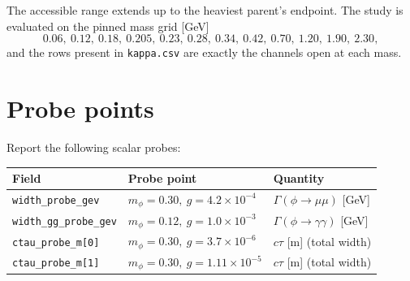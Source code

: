 \documentclass[11pt]{article}
\begin{document}
\noindent
The accessible range extends up to the heaviest parent's endpoint. The study is
evaluated on the pinned mass grid [GeV]
\[
0.06,\ 0.12,\ 0.18,\ 0.205,\ 0.23,\ 0.28,\ 0.34,\ 0.42,\ 0.70,\ 1.20,\ 1.90,\ 2.30,
\]
and the rows present in \texttt{kappa.csv} are exactly the channels open at each
mass.

\section*{Probe points}

Report the following scalar probes:

\begin{center}
\begin{tabular}{@{}lll@{}}
\toprule
Field & Probe point & Quantity \\
\midrule
\texttt{width\_probe\_gev} & $m_\phi=0.30,\ g=4.2\times10^{-4}$ & $\Gamma(\phi\to\mu\mu)$ [GeV] \\
\texttt{width\_gg\_probe\_gev} & $m_\phi=0.12,\ g=1.0\times10^{-3}$ & $\Gamma(\phi\to\gamma\gamma)$ [GeV] \\
\texttt{ctau\_probe\_m[0]} & $m_\phi=0.30,\ g=3.7\times10^{-6}$ & $c\tau$ [m] (total width) \\
\texttt{ctau\_probe\_m[1]} & $m_\phi=0.30,\ g=1.11\times10^{-5}$ & $c\tau$ [m] (total width) \\
\bottomrule
\end{tabular}
\end{center}
\end{document}
